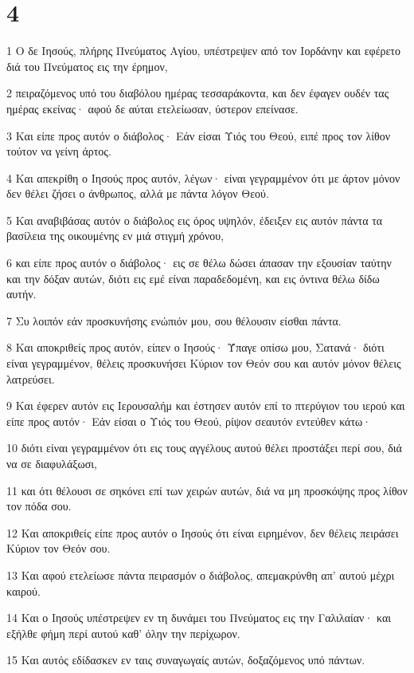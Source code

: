 \chapter{4}

\par 1 Ο δε Ιησούς, πλήρης Πνεύματος Αγίου, υπέστρεψεν από τον Ιορδάνην και εφέρετο διά του Πνεύματος εις την έρημον,
\par 2 πειραζόμενος υπό του διαβόλου ημέρας τεσσαράκοντα, και δεν έφαγεν ουδέν τας ημέρας εκείνας· αφού δε αύται ετελείωσαν, ύστερον επείνασε.
\par 3 Και είπε προς αυτόν ο διάβολος· Εάν είσαι Υιός του Θεού, ειπέ προς τον λίθον τούτον να γείνη άρτος.
\par 4 Και απεκρίθη ο Ιησούς προς αυτόν, λέγων· είναι γεγραμμένον ότι με άρτον μόνον δεν θέλει ζήσει ο άνθρωπος, αλλά με πάντα λόγον Θεού.
\par 5 Και αναβιβάσας αυτόν ο διάβολος εις όρος υψηλόν, έδειξεν εις αυτόν πάντα τα βασίλεια της οικουμένης εν μιά στιγμή χρόνου,
\par 6 και είπε προς αυτόν ο διάβολος· εις σε θέλω δώσει άπασαν την εξουσίαν ταύτην και την δόξαν αυτών, διότι εις εμέ είναι παραδεδομένη, και εις όντινα θέλω δίδω αυτήν.
\par 7 Συ λοιπόν εάν προσκυνήσης ενώπιόν μου, σου θέλουσιν είσθαι πάντα.
\par 8 Και αποκριθείς προς αυτόν, είπεν ο Ιησούς· Ύπαγε οπίσω μου, Σατανά· διότι είναι γεγραμμένον, θέλεις προσκυνήσει Κύριον τον Θεόν σου και αυτόν μόνον θέλεις λατρεύσει.
\par 9 Και έφερεν αυτόν εις Ιερουσαλήμ και έστησεν αυτόν επί το πτερύγιον του ιερού και είπε προς αυτόν· Εάν είσαι ο Υιός του Θεού, ρίψον σεαυτόν εντεύθεν κάτω·
\par 10 διότι είναι γεγραμμένον ότι εις τους αγγέλους αυτού θέλει προστάξει περί σου, διά να σε διαφυλάξωσι,
\par 11 και ότι θέλουσι σε σηκόνει επί των χειρών αυτών, διά να μη προσκόψης προς λίθον τον πόδα σου.
\par 12 Και αποκριθείς είπε προς αυτόν ο Ιησούς ότι είναι ειρημένον, δεν θέλεις πειράσει Κύριον τον Θεόν σου.
\par 13 Και αφού ετελείωσε πάντα πειρασμόν ο διάβολος, απεμακρύνθη απ' αυτού μέχρι καιρού.
\par 14 Και ο Ιησούς υπέστρεψεν εν τη δυνάμει του Πνεύματος εις την Γαλιλαίαν· και εξήλθε φήμη περί αυτού καθ' όλην την περίχωρον.
\par 15 Και αυτός εδίδασκεν εν ταις συναγωγαίς αυτών, δοξαζόμενος υπό πάντων.
